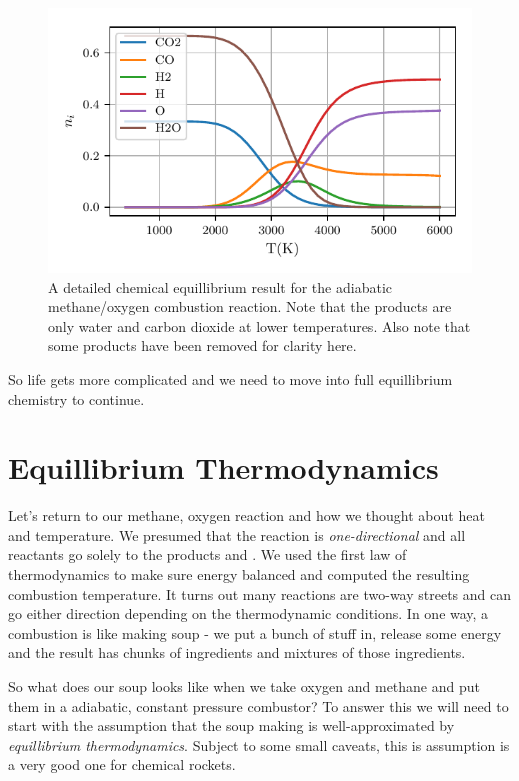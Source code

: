 \documentclass[twocolumn]{memoir} %
\makeatletter
\newcommand\reaction@[1]{\begin{equation}\ce{#1}\end{equation}}
\newcommand\reaction@nonumber[1]%
        {\begin{equation*}\ce{#1}\end{equation*}}
\newcommand\reaction{\@ifstar{\reaction@nonumber}{\reaction@}}
\makeatother
\begin{document}
\begin{figure}[H]
    \includegraphics[width=\columnwidth]{ch4_o2_full_composition}
    \caption{A detailed chemical equillibrium result for the adiabatic methane/oxygen combustion
    reaction.  Note that the products are only water and carbon dioxide at lower temperatures.
    Also note that some products have been removed for clarity here.}
\end{figure}

So life gets more complicated and we need to move into full equillibrium 
chemistry to continue.

\section{Equillibrium Thermodynamics}

Let's return to our methane, oxygen reaction and how we thought about heat and temperature.
%
\reaction{CH4(g) + 2O2(g) -> 2H2O(g) + CO2(g) + $\Delta H^\circ_{rxn}$}
%
We presumed that the reaction is 
\emph{one-directional} and all reactants go solely to the products  and .  We used the
first law of thermodynamics to make sure energy balanced and computed the resulting combustion temperature.
It turns
out many reactions are two-way streets and can go either direction depending on the thermodynamic
conditions.  In one way, a combustion is like making soup - we put a bunch of stuff in, release some
energy and the result has chunks of ingredients and mixtures of those ingredients.

So what does our soup looks like when we take oxygen and methane and put them in a adiabatic, constant 
pressure combustor?  To answer this we will need to start with the assumption that the soup
making is well-approximated by \emph{equillibrium thermodynamics}.  Subject to some small caveats,
this is assumption is a very good one for chemical rockets. 
\end{document}
